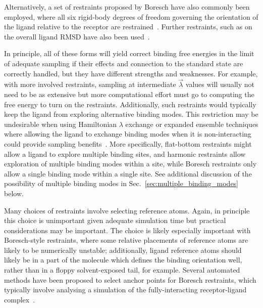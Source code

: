 \documentclass[9pt,bestpractices]{livecoms}
\begin{document}
Alternatively, a set of restraints proposed by Boresch have also commonly been employed, where all six rigid-body degrees of freedom governing the orientation of the ligand relative to the receptor are restrained~\cite{boresch2003absolute, leitgeb2005alchemical}.
Further restraints, such as on the overall ligand RMSD have also been used~\cite{woo2005calculation}.

In principle, all of these forms will yield correct binding free energies in the limit of adequate sampling if their effects and connection to the standard state are correctly handled, but they have different strengths and weaknesses.
For example, with more involved restraints, sampling at intermediate $\vec{\lambda}$ values will usually not need to be as extensive but more computational effort must go to computing the free energy to turn on the restraints.
Additionally, such restraints would typically keep the ligand from exploring alternative binding modes. This  restriction may be undesirable when using Hamiltonian $\lambda$ exchange or expanded ensemble techniques where allowing the ligand to exchange binding modes when it is non-interacting could provide sampling benefits~\cite{wang2013identifying}.
More specifically, flat-bottom restraints might allow a ligand to explore multiple binding sites, and harmonic restraints allow exploration of multiple binding modes within a site, while Boresch restraints only allow a single binding mode within a single site.
See additional discussion of the possibility of multiple binding modes in Sec.~\ref{sec:multiple_binding_modes} below.

Many choices of restraints involve selecting reference atoms.
Again, in principle this choice is unimportant given adequate simulation time but practical considerations may be important.
The choice is likely especially important with Boresch-style restraints, where some relative placements of reference atoms are likely to be numerically unstable; additionally, ligand reference atoms should likely be in a part of the molecule which defines the binding orientation well, rather than in a floppy solvent-exposed tail, for example. Several automated methods have been proposed to select anchor points for Boresch restraints, which typically involve analysing a simulation of the fully-interacting receptor-ligand complex~\cite{alibay2022evaluating, alibay2021mdrestraintsgenerator, baumann2023broadening, chen2023enhancing, hedges2023suite}.
\end{document}
